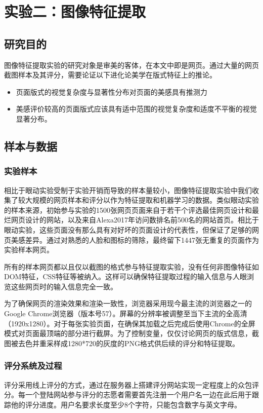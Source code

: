 \chapter{实验二：图像特征提取}
\label{chap:exp2}

\section{研究目的}
图像特征提取实验的研究对象是审美的客体，在本文中即是网页。通过大量的网页截图样本及其评分，需要论证以下进化论美学在版式特征上的推论。

\begin{itemize}
  \item 页面版式的视觉复杂度与显著性分布对页面的美感具有推测力
  \item 美感评价较高的页面版式应该具有适中范围的视觉复杂度和适度不平衡的视觉显著分布。
\end{itemize}

\section{样本与数据}
\subsection{实验样本}
相比于眼动实验受制于实验开销而导致的样本量较小，图像特征提取实验中我们收集了较大规模的网页样本和评分以作为特征提取和机器学习的数据。类似眼动实验的样本来源，初始参与实验的1500张网页页面来自于若干个评选最佳网页设计和最烂网页设计的网站，以及来自Alexa2017年访问数排名前500名的网站首页。相比于眼动实验，这些页面没有那么具有对好坏的页面设计的代表性，但保证了足够的网页美感差异。通过对熟悉的人脸和图标的筛除，最终留下1447张无重复的页面作为实验样本网页。

所有的样本网页都以且仅以截图的格式参与特征提取实验，没有任何非图像特征如DOM特征，CSS特征等被纳入。这样可以确保特征提取过程的输入信息与人眼浏览这些网页时的输入信息完全一致。

为了确保网页的渲染效果和渲染一致性，浏览器采用现今最主流的浏览器之一的Google Chrome浏览器（版本号57）。屏幕的分辨率被调整至当下主流的全高清（1920x1280）。对于每张实验页面，在确保其加载之后完成后使用Chrome的全屏模式对页面最顶端的部分进行截屏。为了控制变量，仅仅讨论网页的版式信息，截图被去色并重采样成1280*720的灰度的PNG格式供后续的评分和特征提取。

\subsection{评分系统及过程}
评分采用线上评分的方式，通过在服务器上搭建评分网站实现一定程度上的众包评分。每一个登陆网站参与评分的志愿者需要首先注册一个用户名一边在此后用于跟踪他的评分进度。用户名要求长度至少8个字符，只能包含数字与英文字母。

